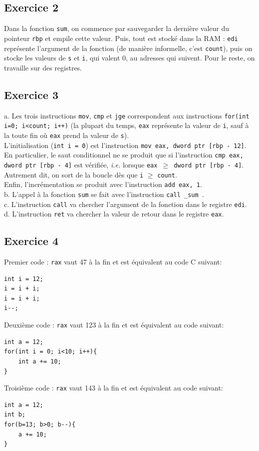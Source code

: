 \documentclass[11pt, a4 paper]{article}
\begin{document}
\subsection{Exercice 2}
Dans la fonction \texttt{sum}, on commence par sauvegarder la dernière valeur du pointeur \texttt{rbp} et empile cette valeur. Puis, tout est stocké dans la RAM : \texttt{edi} représente l'argument de la fonction (de manière informelle, c'est \texttt{count}), puis on stocke les valeurs de \texttt{s} et \texttt{i}, qui valent 0, au adresses qui suivent.
Pour le reste, on travaille sur des registres.


\subsection{Exercice 3}
a. Les trois instructions \texttt{mov}, \texttt{cmp} et \texttt{jge} correspondent aux instructions \texttt{for(int i=0; i<count; i++)} (la plupart du temps, \texttt{eax} représente la valeur de \texttt{i}, sauf à la toute fin où \texttt{eax} prend la valeur de \texttt{s}).\\
L'initialisation (\texttt{int i = 0}) est l'instruction \texttt{mov	eax, dword ptr [rbp - 12]}.
En particulier, le saut conditionnel ne se produit que si l'instruction \texttt{cmp	eax, dword ptr [rbp - 4]} est vérifiée, \textit{i.e.} lorsque \texttt{eax $\geq$ dword ptr [rbp - 4]}. Autrement dit, on sort de la boucle dès que \texttt{i} $\geq$ \texttt{count}.\\
Enfin, l'incrémentation se produit avec l'instruction \texttt{add	eax, 1}.\\

b. L'appel à la fonction \texttt{sum} se fait avec l'instruction \texttt{call	\_sum
}.\\

c. L'instruction \texttt{call} va chercher l'argument de la fonction dans le registre \texttt{edi}.\\

d. L'instruction \texttt{ret} va chercher la valeur de retour dans le registre \texttt{eax}.

\subsection{Exercice 4}
Premier code : \texttt{rax} vaut 47 à la fin et est équivalent au code C suivant:
\begin{lstlisting}[style=CStyle]
int i = 12;
i = i + i;
i = i + i;
i--;
\end{lstlisting}
Deuxième code : \texttt{rax} vaut 123 à la fin et est équivalent au code suivant:
\begin{lstlisting}[style=CStyle]
int a = 12;
for(int i = 0; i<10; i++){
    int a += 10;
}
\end{lstlisting}
Troisième code : \texttt{rax} vaut 143 à la fin et est équivalent au code suivant:
\begin{lstlisting}[style=CStyle]
int a = 12;
int b;
for(b=13; b>0; b--){
    a += 10;
}
\end{lstlisting}
\end{document}
